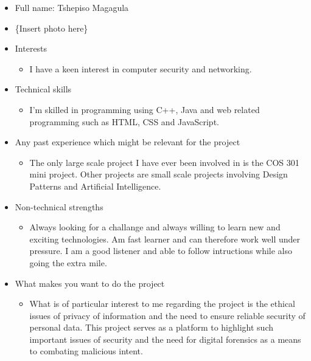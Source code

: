 
\begin{itemize}
	\item Full name: Tshepiso Magagula
	\item \{Insert photo here\}
	\item Interests
		\begin{itemize}
			\item I have a keen interest in computer security and networking.
		\end{itemize}
	\item Technical skills
		\begin{itemize}
			\item I'm skilled in programming using C++, Java and web related 
			programming such as HTML, CSS and JavaScript.
		\end{itemize}
	\item Any past experience which might be relevant for the project
		\begin{itemize}
			\item The only large scale project I have ever been involved in is the 				COS 301 mini project. Other projects are small scale projects involving 			Design Patterns and Artificial Intelligence.
		\end{itemize}
	\item Non-technical strengths
		\begin{itemize}
			\item Always looking for a challange and always willing to learn new 
			and exciting technologies. Am fast learner and can therefore work well under pressure. I am
			 a good listener and able to follow intructions while also going the extra mile. 
		\end{itemize}
	\item What makes you want to do the project
		\begin{itemize}
			\item What is of particular interest to me regarding the project 
			is the ethical issues of privacy of information and the need to 
			ensure reliable security of personal data. This project serves as
			 a platform to highlight such important issues of security and 
			 the need for digital forensics as a means to combating malicious 
			 intent.
		\end{itemize}



\end{itemize}
